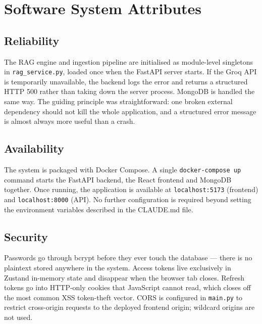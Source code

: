 \section{Software System Attributes}

\subsection{Reliability}

The RAG engine and ingestion pipeline are initialised as module-level singletons in
\texttt{rag\_service.py}, loaded once when the FastAPI server starts. If the Groq API
is temporarily unavailable, the backend logs the error and returns a structured HTTP 500
rather than taking down the server process. MongoDB is handled the same way. The guiding
principle was straightforward: one broken external dependency should not kill the whole
application, and a structured error message is almost always more useful than a crash.

\subsection{Availability}

The system is packaged with Docker Compose. A single \texttt{docker-compose up} command
starts the FastAPI backend, the React frontend and MongoDB together. Once running, the
application is available at \texttt{localhost:5173} (frontend) and \texttt{localhost:8000}
(API). No further configuration is required beyond setting the environment variables
described in the CLAUDE.md file.

\subsection{Security}

Passwords go through bcrypt before they ever touch the database --- there is no plaintext
stored anywhere in the system. Access tokens live exclusively in Zustand in-memory state
and disappear when the browser tab closes. Refresh tokens go into HTTP-only cookies that
JavaScript cannot read, which closes off the most common XSS token-theft vector. CORS is
configured in \texttt{main.py} to restrict cross-origin requests to the deployed frontend
origin; wildcard origins are not used.

